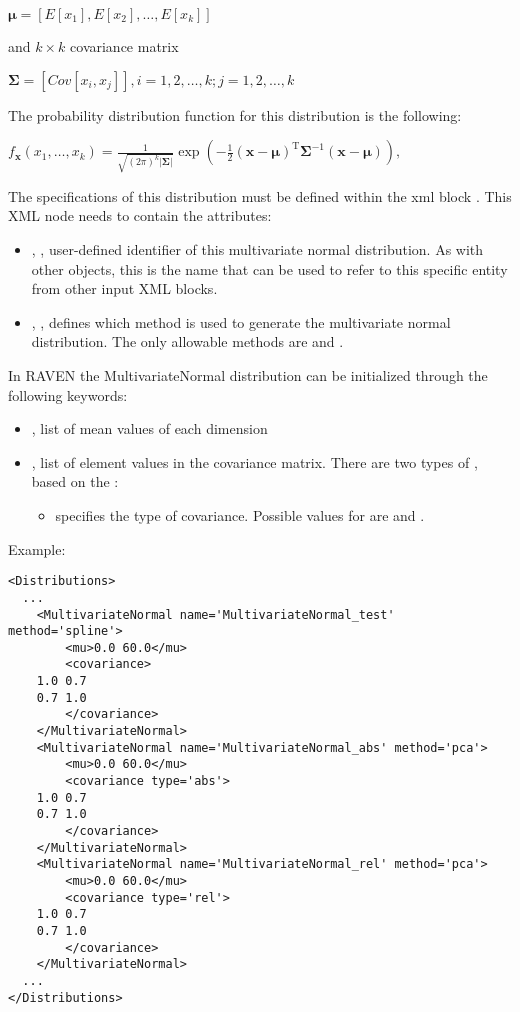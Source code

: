 $\boldsymbol\mu= [E[x_1], E[x_2], …, E[x_k]]$

and $k \times k$ covariance matrix

$\boldsymbol\Sigma = [Cov[x_i,x_j]] , i=1,2,\ldots,k ; j=1,2,\ldots,k$

The probability distribution function for this distribution is the following:

$
f_{\mathbf x}(x_1,\ldots,x_k) =
\frac{1}{\sqrt{(2\pi)^k|\boldsymbol\Sigma|}}
\exp\left(-\frac{1}{2}({\mathbf x}-{\boldsymbol\mu})^\mathrm{T}{\boldsymbol\Sigma}^{-1}({\mathbf x}-{\boldsymbol\mu})
\right),
$

The specifications of this distribution must be defined within the xml block .
This XML node needs to contain the attributes:
\vspace{-5mm}
\begin{itemize}
\itemsep0em
\item {}, , user-defined identifier of this multivariate normal distribution.
%
\nb As with other objects, this is the name that can be used to refer to this specific entity from other input XML blocks.
\item {}, , defines which method is used to generate the multivariate normal distribution. 
The only allowable methods are  and .
%
\end{itemize}
\vspace{-5mm}

In RAVEN the MultivariateNormal distribution can be initialized through the following keywords:
\begin{itemize}
  \item {}, list of mean values of each dimension
  \item {}, list of element values in the covariance matrix. There are two types of , based on the :
  \begin{itemize}
    \item {}  specifies the type of covariance. Possible values for  are  and .
  \end{itemize}
\end{itemize}

Example:
\begin{lstlisting}[style=XML]
<Distributions>
  ...
    <MultivariateNormal name='MultivariateNormal_test' method='spline'>
        <mu>0.0 60.0</mu>
        <covariance>
	1.0 0.7
	0.7 1.0
        </covariance>
    </MultivariateNormal>
    <MultivariateNormal name='MultivariateNormal_abs' method='pca'>
        <mu>0.0 60.0</mu>
        <covariance type='abs'>
	1.0 0.7
	0.7 1.0
        </covariance>
    </MultivariateNormal>
    <MultivariateNormal name='MultivariateNormal_rel' method='pca'>
        <mu>0.0 60.0</mu>
        <covariance type='rel'>
	1.0 0.7
	0.7 1.0
        </covariance>
    </MultivariateNormal>
  ...
</Distributions>
\end{lstlisting}

